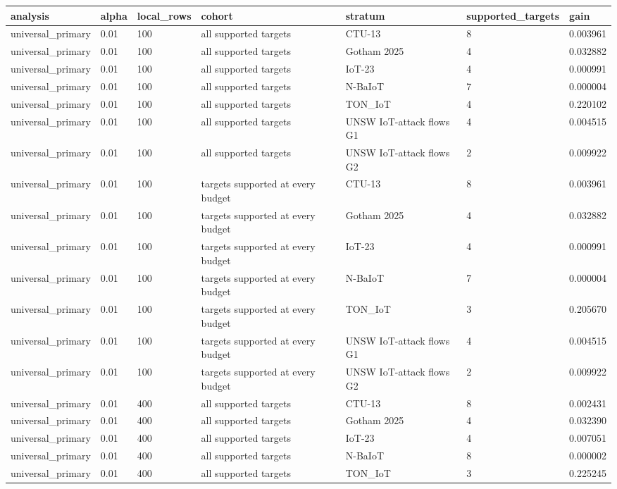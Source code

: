 \begin{tabular}{lllllll}
\toprule
analysis & alpha & local\_rows & cohort & stratum & supported\_targets & gain \\
\midrule
universal\_primary & 0.01 & 100 & all supported targets & CTU-13 & 8 & 0.003961 \\
universal\_primary & 0.01 & 100 & all supported targets & Gotham 2025 & 4 & 0.032882 \\
universal\_primary & 0.01 & 100 & all supported targets & IoT-23 & 4 & 0.000991 \\
universal\_primary & 0.01 & 100 & all supported targets & N-BaIoT & 7 & 0.000004 \\
universal\_primary & 0.01 & 100 & all supported targets & TON\_IoT & 4 & 0.220102 \\
universal\_primary & 0.01 & 100 & all supported targets & UNSW IoT-attack flows G1 & 4 & 0.004515 \\
universal\_primary & 0.01 & 100 & all supported targets & UNSW IoT-attack flows G2 & 2 & 0.009922 \\
universal\_primary & 0.01 & 100 & targets supported at every budget & CTU-13 & 8 & 0.003961 \\
universal\_primary & 0.01 & 100 & targets supported at every budget & Gotham 2025 & 4 & 0.032882 \\
universal\_primary & 0.01 & 100 & targets supported at every budget & IoT-23 & 4 & 0.000991 \\
universal\_primary & 0.01 & 100 & targets supported at every budget & N-BaIoT & 7 & 0.000004 \\
universal\_primary & 0.01 & 100 & targets supported at every budget & TON\_IoT & 3 & 0.205670 \\
universal\_primary & 0.01 & 100 & targets supported at every budget & UNSW IoT-attack flows G1 & 4 & 0.004515 \\
universal\_primary & 0.01 & 100 & targets supported at every budget & UNSW IoT-attack flows G2 & 2 & 0.009922 \\
universal\_primary & 0.01 & 400 & all supported targets & CTU-13 & 8 & 0.002431 \\
universal\_primary & 0.01 & 400 & all supported targets & Gotham 2025 & 4 & 0.032390 \\
universal\_primary & 0.01 & 400 & all supported targets & IoT-23 & 4 & 0.007051 \\
universal\_primary & 0.01 & 400 & all supported targets & N-BaIoT & 8 & 0.000002 \\
universal\_primary & 0.01 & 400 & all supported targets & TON\_IoT & 3 & 0.225245 \\

\end{tabular}

